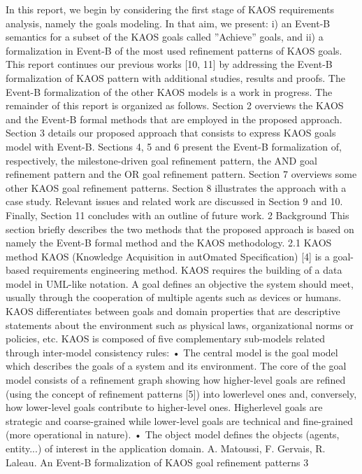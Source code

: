 In this report, we begin by considering the first stage of KAOS requirements analysis,
namely the goals modeling. In that aim, we present: i) an Event-B semantics for a subset
of the KAOS goals called ”Achieve” goals, and ii) a formalization in Event-B of the most
used refinement patterns of KAOS goals. This report continues our previous works [10, 11]
by addressing the Event-B formalization of KAOS pattern with additional studies, results
and proofs. The Event-B formalization of the other KAOS models is a work in progress.
The remainder of this report is organized as follows. Section 2 overviews the KAOS and the
Event-B formal methods that are employed in the proposed approach. Section 3 details our
proposed approach that consists to express KAOS goals model with Event-B. Sections 4, 5
and 6 present the Event-B formalization of, respectively, the milestone-driven goal refinement
pattern, the AND goal refinement pattern and the OR goal refinement pattern. Section 7
overviews some other KAOS goal refinement patterns. Section 8 illustrates the approach with
a case study. Relevant issues and related work are discussed in Section 9 and 10. Finally,
Section 11 concludes with an outline of future work.
2 Background
This section briefly describes the two methods that the proposed approach is based on namely
the Event-B formal method and the KAOS methodology.
2.1 KAOS method
KAOS (Knowledge Acquisition in autOmated Specification) [4] is a goal-based requirements
engineering method. KAOS requires the building of a data model in UML-like notation. A
goal defines an objective the system should meet, usually through the cooperation of multiple
agents such as devices or humans. KAOS differentiates between goals and domain properties
that are descriptive statements about the environment such as physical laws, organizational
norms or policies, etc. KAOS is composed of five complementary sub-models related through
inter-model consistency rules:
• The central model is the goal model which describes the goals of a system and its
environment. The core of the goal model consists of a refinement graph showing how
higher-level goals are refined (using the concept of refinement patterns [5]) into lowerlevel ones and, conversely, how lower-level goals contribute to higher-level ones. Higherlevel goals are strategic and coarse-grained while lower-level goals are technical and
fine-grained (more operational in nature).
• The object model defines the objects (agents, entity...) of interest in the application
domain.
A. Matoussi, F. Gervais, R. Laleau. An Event-B formalization of KAOS goal refinement patterns 3

